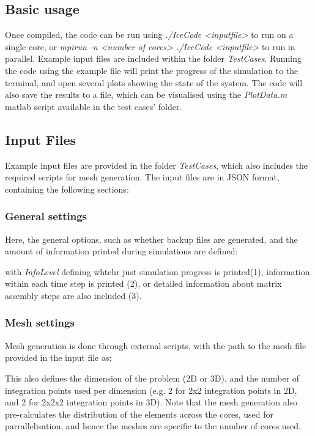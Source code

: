 \documentclass[3p]{elsarticle} %
\let\oldtodo\todo
\renewcommand{\todo}[1]{\oldtodo[inline]{#1}}
\newcommand{\CodeSnipU}[4]{}
\begin{document}
\subsection{Basic usage}
\label{sec:usage}
Once compiled, the code can be run using \textit{./IceCode <inputfile>} to run on a single core, or \textit{mpirun -n <number of cores> ./IceCode <inputfile>} to run in parallel. Example input files are included within the folder \textit{TestCases}. Running the code using the example file will print the progress of the simulation to the terminal, and open several plots showing the state of the system. The code will also save the results to a file, which can be visualised using the \textit{PlotData.m} matlab script available in the test cases' folder. 

\begin{figure}
	\centering
	\caption{\todo{caption}}
	\label{fig:Results}
\end{figure}

\subsection{Input Files}
Example input files are provided in the folder \textit{TestCases}, which also includes the required scripts for mesh generation. The input files are in JSON format, containing the following sections:

\subsubsection{General settings}
Here, the general options, such as whether backup files are generated, and the amount of information printed during simulations are defined:
\CodeSnipU{TestCases/TriAxialCompression/TriAxial.json}{2}{10}{TestCases/TriAxialCompression/TriAxial.json} 
with \textit{InfoLevel} defining whtehr just simulation progress is printed(1), information within each time step is printed (2), or detailed information about matrix assembly steps are also included (3).

\subsubsection{Mesh settings}
Mesh generation is done through external scripts, with the path to the mesh file provided in the input file as:
\CodeSnipU{TestCases/TriAxialCompression/TriAxial.json}{11}{15}{TestCases/TriAxialCompression/TriAxial.json} 
This also defines the dimension of the problem (2D or 3D), and the number of integration points used per dimension (e.g. 2 for 2x2 integration points in 2D, and 2 for 2x2x2 integration points in 3D). Note that the mesh generation also pre-calculates the distribution of the elements across the cores, used for parrallelisation, and hence the meshes are specific to the number of cores used.
\end{document}
